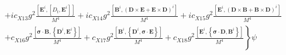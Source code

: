 \begin{align}
&+i c_{X 13} g^{2} \frac{\left[\bm{E}^{i},\left[D_{t}, \bm{E}^{i}\right]\right]}{M^{4}}+i c_{X 14} g^{2} \frac{\left[\bm{B}^{i},(\bm{D} \times \bm{E}+\bm{E} \times \bm{D})^{i}\right]}{M^{4}}+i c_{X 15} g^{2} \frac{\left[\bm{E}^{i},(\bm{D} \times \bm{B}+\bm{B} \times \bm{D})^{i}\right]}{M^{4}}\nonumber\\
&\left.+c_{X 16} g^{2} \frac{\left[\bm{\sigma} \cdot \bm{B},\left\{\bm{D}^{i}, \bm{E}^{i}\right\}\right]}{M^{4}}+c_{X 17} g^{2} \frac{\left[\bm{B}^{i},\left\{\bm{D}^{i}, \bm{\sigma} \cdot \bm{E}\right\}\right]}{M^{4}}+c_{X 18} g^{2} \frac{\left[\bm{E}^{i},\left\{\bm{\sigma} \cdot \bm{D}, \bm{B}^{i}\right\}\right]}{M^{4}}\right\} \psi
\end{align}
